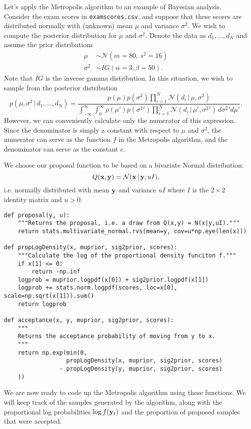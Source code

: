 Let's apply the Metropolis algorithm to an example of Bayesian analysis.
Consider the exam scores in \texttt{examscores.csv}, and suppose that these scores are distributed normally with (unknown) mean $\mu$ and variance $\sigma^2$.
We wish to compute the posterior distribution for $\mu$ and $\sigma^2$.
Denote the data as $d_1,\ldots,d_N$ and assume the prior distributions
\begin{align*}
\mu &\sim \mathcal{N}(m=80,\ s^2=16)\\
\sigma^2 &\sim IG(\alpha=3,\beta=50).
\end{align*}
Note that $IG$ is the inverse gamma distribution.
In this situation, we wish to sample from the posterior distribution
\[
p(\mu,\sigma^2 \,|\,d_1,\ldots,d_N) 
= \frac{
p(\mu)p(\sigma^2)\prod_{i=1}^N \mathcal{N}(d_i \, | \, \mu, \sigma^2)
}
{
\int_{-\infty}^\infty
\int_{0}^\infty 
p(\mu')p({\sigma^2}')
\prod_{i=1}^N
\mathcal{N}(d_i \, | \, \mu', {\sigma^2}')
\,d{\sigma^2}' d\mu'
}.
\]
However, we can conveniently calculate only the numerator of this expression.
Since the denominator is simply a constant with respect to $\mu$ and $\sigma^2$, the numerator can serve as the function $f$ in the Metropolis algorithm, and the denominator can serve as the constant $c$.

We choose our proposal function to be based on a bivariate Normal distribution:
\[
Q(\mathbf{x},\mathbf{y}) = \mathcal{N}(\mathbf{x}\, | \, \mathbf{y}, uI),
\]
i.e. normally distributed with mean $\mathbf{y}$ and variance $uI$
where $I$ is the $2\times 2$ identity matrix and $u>0$.
\begin{lstlisting}
def proposal(y, u):
    """Returns the proposal, i.e. a draw from Q(x,y) = N(x|y,uI)."""
    return stats.multivariate_normal.rvs(mean=y, cov=u*np.eye(len(x)))
    
def propLogDensity(x, muprior, sig2prior, scores):
    """Calculate the log of the proportional density funciton f."""
    if x[1] <= 0:
        return -np.inf
    logprob = muprior.logpdf(x[0]) + sig2prior.logpdf(x[1])
    logprob += stats.norm.logpdf(scores, loc=x[0], scale=np.sqrt(x[1])).sum()
    return logprob
    
def acceptance(x, y, muprior, sig2prior, scores):
    """
    Returns the acceptance probability of moving from y to x.
    """
    return np.exp(min(0, 
                  propLogDensity(x, muprior, sig2prior, scores) 
                - propLogDensity(y, muprior, sig2prior, scores)
    ))
\end{lstlisting}

We are now ready to code up the Metropolis algorithm using these functions.
We will keep track of the samples generated by the algorithm, along with the proportional log probabilities $\log f(\mathbf{y}_t)$ and the proportion of proposed samples that were accepted.

